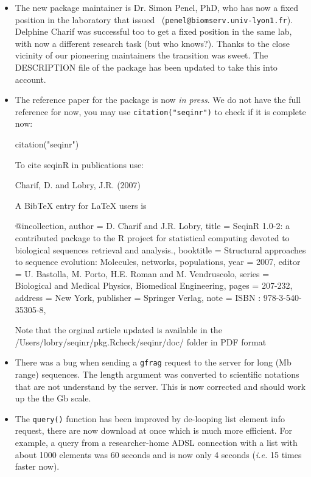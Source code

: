 \documentclass{article}
\begin{document}
\begin{itemize}
\item The new package maintainer is Dr. Simon Penel, PhD, who has now a fixed position in the
laboratory that issued \seqinr~(\texttt{penel@biomserv.univ-lyon1.fr}). Delphine Charif was
successful too to get a fixed position in the same lab, with now a different research task (but who knows?).
Thanks to the close vicinity of our pioneering maintainers the transition was sweet. The DESCRIPTION
file of the \seqinr{} package has been updated to take this into account.

\item The reference paper for the package is now \textit{in press}. We do not have the full
reference for now, you may use \texttt{citation("seqinr")} to check if it is complete now:
\begin{Schunk}
\begin{Sinput}
 citation("seqinr")
\end{Sinput}
\begin{Soutput}
To cite seqinR in publications use:

  Charif, D. and Lobry, J.R. (2007)

A BibTeX entry for LaTeX users is

  @incollection{,
    author = {D. Charif and J.R. Lobry},
    title = {Seqin{R} 1.0-2: a contributed package to the {R} project for statistical computing devoted to biological sequences retrieval and analysis.},
    booktitle = {Structural approaches to sequence evolution: Molecules, networks, populations},
    year = {2007},
    editor = {U. Bastolla, M. Porto, H.E. Roman and M. Vendruscolo},
    series = {Biological and Medical Physics, Biomedical Engineering},
    pages = {207-232},
    address = {New York},
    publisher = {Springer Verlag},
    note = {{ISBN :} 978-3-540-35305-8},
  }

Note that the orginal article updated is available in the
/Users/lobry/seqinr/pkg.Rcheck/seqinr/doc/ folder in PDF format
\end{Soutput}
\end{Schunk}

\item There was a bug when sending a \texttt{gfrag} request to the server for long (Mb range) 
sequences. The length argument was converted to scientific notations that are not understand by the
server. This is now corrected and should work up the the Gb scale.

\item The \texttt{query()} function has been improved by de-looping list element info request,
there are now download at once which is much more efficient. For example, a query from a
researcher-home ADSL connection with a list with about 1000 elements was 60 seconds and
is now only 4 seconds (\textit{i.e.} 15 times faster now).


\end{itemize}
\end{document}
